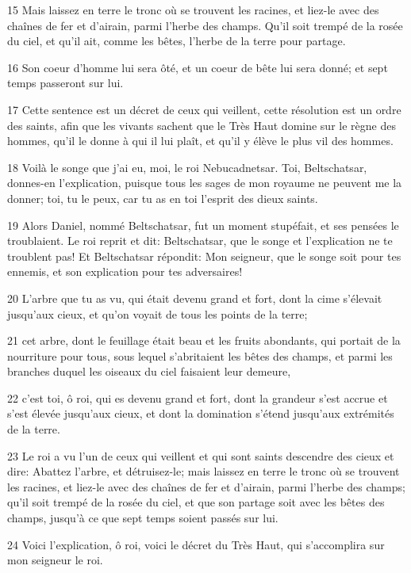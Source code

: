 \par 15 Mais laissez en terre le tronc où se trouvent les racines, et liez-le avec des chaînes de fer et d'airain, parmi l'herbe des champs. Qu'il soit trempé de la rosée du ciel, et qu'il ait, comme les bêtes, l'herbe de la terre pour partage.
\par 16 Son coeur d'homme lui sera ôté, et un coeur de bête lui sera donné; et sept temps passeront sur lui.
\par 17 Cette sentence est un décret de ceux qui veillent, cette résolution est un ordre des saints, afin que les vivants sachent que le Très Haut domine sur le règne des hommes, qu'il le donne à qui il lui plaît, et qu'il y élève le plus vil des hommes.
\par 18 Voilà le songe que j'ai eu, moi, le roi Nebucadnetsar. Toi, Beltschatsar, donnes-en l'explication, puisque tous les sages de mon royaume ne peuvent me la donner; toi, tu le peux, car tu as en toi l'esprit des dieux saints.
\par 19 Alors Daniel, nommé Beltschatsar, fut un moment stupéfait, et ses pensées le troublaient. Le roi reprit et dit: Beltschatsar, que le songe et l'explication ne te troublent pas! Et Beltschatsar répondit: Mon seigneur, que le songe soit pour tes ennemis, et son explication pour tes adversaires!
\par 20 L'arbre que tu as vu, qui était devenu grand et fort, dont la cime s'élevait jusqu'aux cieux, et qu'on voyait de tous les points de la terre;
\par 21 cet arbre, dont le feuillage était beau et les fruits abondants, qui portait de la nourriture pour tous, sous lequel s'abritaient les bêtes des champs, et parmi les branches duquel les oiseaux du ciel faisaient leur demeure,
\par 22 c'est toi, ô roi, qui es devenu grand et fort, dont la grandeur s'est accrue et s'est élevée jusqu'aux cieux, et dont la domination s'étend jusqu'aux extrémités de la terre.
\par 23 Le roi a vu l'un de ceux qui veillent et qui sont saints descendre des cieux et dire: Abattez l'arbre, et détruisez-le; mais laissez en terre le tronc où se trouvent les racines, et liez-le avec des chaînes de fer et d'airain, parmi l'herbe des champs; qu'il soit trempé de la rosée du ciel, et que son partage soit avec les bêtes des champs, jusqu'à ce que sept temps soient passés sur lui.
\par 24 Voici l'explication, ô roi, voici le décret du Très Haut, qui s'accomplira sur mon seigneur le roi.
